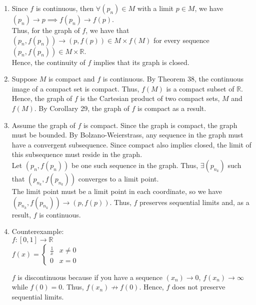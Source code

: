 \documentclass[12pt]{article}
\begin{document}
\begin{enumerate}[label=(\alph*)]
	\item Since $f$ is continuous, then $\forall (p_n) \in M$ with a limit $p \in M$, we have $(p_n) \to p \implies f(p_n) \to f(p)$.\\
	
	Thus, for the graph of $f$, we have that $(p_n, f(p_n)) \to (p, f(p)) \in M \times f(M)$ for every sequence $(p_n, f(p_n)) \in M \times \mathbb{R}$.\\
	
	Hence, the continuity of $f$ implies that its graph is closed.
	
	\item Suppose $M$ is compact and $f$ is continuous. By Theorem 38, the continuous image of a compact set is compact. Thus, $f(M)$ is a compact subset of $\mathbb{R}$.\\
	
	Hence, the graph of $f$ is the Cartesian product of two compact sets, $M$ and $f(M)$. By Corollary 29, the graph of $f$ is compact as a result.
	
	\item Assume the graph of $f$ is compact. Since the graph is compact, the graph must be bounded. By Bolzano-Weierstrass, any sequence in the graph must have a convergent subsequence. Since compact also implies closed, the limit of this subsequence must reside in the graph.\\
	
	Let $(p_n, f(p_n))$ be one such sequence in the graph. Thus, $\exists (p_{n_k})$ such that $(p_{n_k}, f(p_{n_k}))$ converges to a limit point.\\
	
	The limit point must be a limit point in each coordinate, so we have $(p_{n_k}, f(p_{n_k})) \to (p, f(p))$. Thus, $f$ preserves sequential limits and, as a result, $f$ is continuous.
	
	\item Counterexample:\\
	$f: [0, 1] \to \mathbb{R}$\\
	
	$f(x) = \begin{cases} 
      \frac{1}{x} & x \neq 0 \\
      0 & x = 0
   \end{cases}$
   
   $f$ is discontinuous because if you have a sequence $(x_n) \to 0$, $f(x_n) \to 
   \infty$ while $f(0) = 0$. Thus, $f(x_n) \not\to f(0)$. Hence, $f$ does not preserve sequential limits.
	
\end{enumerate}
\newpage
\end{document}
